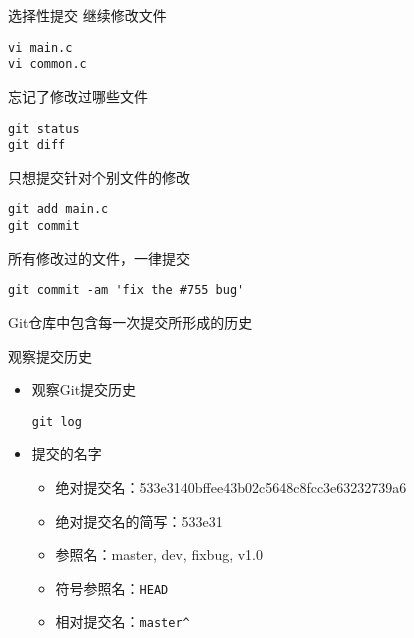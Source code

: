 \begin{frame}[<+->][fragile]{选择性提交}
\onslide<+->
继续修改文件
\begin{Verbatim}[frame=single,commandchars=\\\{\}]
vi main.c
vi common.c
\end{Verbatim}

\onslide<+->
忘记了修改过哪些文件
\begin{Verbatim}[frame=single,commandchars=\\\{\}]
git status
git diff
\end{Verbatim}

\onslide<+->
只想提交针对个别文件的修改
\begin{Verbatim}[frame=single,commandchars=\\\{\}]
git add main.c
git commit
\end{Verbatim}

\onslide<+->
所有修改过的文件，一律提交
\begin{Verbatim}[frame=single,commandchars=\\\{\}]
git commit -am 'fix the #755 bug'
\end{Verbatim}
\end{frame}

\begin{frame}[<+->]{Git仓库中包含每一次提交所形成的历史}
\end{frame}

\begin{frame}[<+->][fragile]{观察提交历史}
  \begin{itemize}
    \item 观察Git提交历史
    \begin{Verbatim}[frame=single,commandchars=\\\{\}]
git log    
    \end{Verbatim}
    \item 提交的名字
    \begin{itemize}
        \item 绝对提交名：533e3140bffee43b02c5648c8fcc3e63232739a6
        \item 绝对提交名的简写：533e31
        \item 参照名：master, dev, fixbug, v1.0
        \item 符号参照名：\verb|HEAD|
        \item 相对提交名：\verb|master^|
    \end{itemize}
  \end{itemize}
\end{frame}


